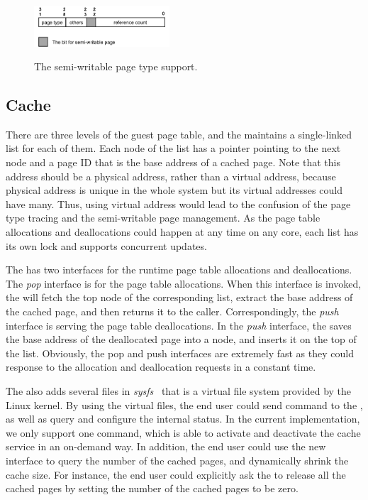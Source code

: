 \begin{figure}[ht]
\centering
\includegraphics[width=0.45\textwidth]{image/implementation/field-of-semi-type.jpg} \\
\caption{The semi-writable page type support.}
\label{fig:field-of-semi-type}
\end{figure}

\subsection{\name Cache}
There are three levels of the guest page table, and the \cache maintains a single-linked list for each of them.
Each node of the list has a pointer pointing to the next node and a page ID that is the base address of a cached page.
Note that this address should be a physical address, rather than a virtual address, because physical address is unique in the whole system but its virtual addresses could have many.
Thus, using virtual address would lead to the confusion of the page type tracing and the semi-writable page management.
As the page table allocations and deallocations could happen at any time on any core, each list has its own lock and supports concurrent updates.

The \cache has two interfaces for the runtime page table allocations and deallocations.
The \emph{pop} interface is for the page table allocations.
When this interface is invoked, the \cache will fetch the top node of the corresponding list, extract the base address of the cached page, and then returns it to the caller.
Correspondingly, the \emph{push} interface is serving the page table deallocations.
In the \emph{push} interface, the \cache saves the base address of the deallocated page into a node, and inserts it on the top of the list.
Obviously, the pop and push interfaces are extremely fast as they could response to the allocation and deallocation requests in a constant time.

The \cache also adds several files in \emph{sysfs}~\cite{love2004linux,mochel2005sysfs} that is a virtual file system provided by the Linux kernel.
By using the virtual files, the end user could send command to the \cache, as well as query and configure the internal status.
In the current implementation, we only support one command, which is able to activate and deactivate the cache service in an on-demand way.
In addition, the end user could use the new interface to query the number of the cached pages, and dynamically shrink the cache size.
For instance, the end user could explicitly ask the \cache to release all the cached pages by setting the number of the cached pages to be zero.

